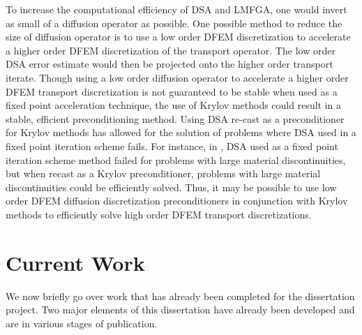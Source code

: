 \documentclass[final,3p,times]{elsarticle}
\begin{document}
To increase the computational efficiency of DSA and LMFGA, one would invert as small of a diffusion operator as possible.
One possible method to reduce the size of diffusion operator is to use a low order DFEM discretization to accelerate a higher order DFEM discretization of the transport operator.
The low order DSA error estimate would then be projected onto the higher order transport iterate.
Though using a low order diffusion operator to accelerate a higher order DFEM transport discretization is not guaranteed to be stable when used as a fixed point acceleration technique, the use of Krylov methods could result in a stable, efficient preconditioning method.
Using DSA re-cast as a preconditioner for Krylov methods has allowed for the solution of problems where DSA used in a fixed point iteration scheme fails.
For instance, in \cite{warsa_krylov}, DSA used as a fixed point iteration scheme method failed for problems with large material discontinuities, but when recast as a Krylov preconditioner, problems with large material discontinuities could be  efficiently solved.
Thus, it may be possible to use low order DFEM diffusion discretization preconditioners in conjunction with Krylov methods to efficiently solve high order DFEM transport discretizations.


\section{Current Work} 

We now briefly go over work that has already been completed for the dissertation project.
Two major elements of this dissertation have already been developed and are in various stages of publication.
\end{document}
